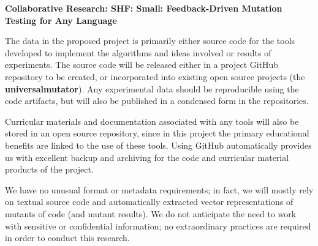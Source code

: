 \documentclass{article}
\begin{document}
\begin{center}
{\Large\sf\textbf{Collaborative Research: SHF: Small: Feedback-Driven Mutation Testing for Any Language}}
\end{center}

The data in the proposed project is primarily either source code for
the tools developed to implement the algorithms and ideas involved or
results of experiments.  The source code will be released either in a
project GitHub repository to be created, or incorporated into existing
open source projects (the {\bf universalmutator}).  Any experimental data should be reproducible using the code artifacts, but will also be published in a condensed form in the repositories.

Curricular
materials and documentation associated with any tools will also be stored in
an open source repository, since in this project the primary
educational benefits are linked to the use of these tools.  Using GitHub automatically provides us with excellent backup
and archiving for the code and curricular material products of the
project.

We have no unusual format or metadata requirements; in fact, we will
mostly rely on textual source code and automatically extracted vector
representations of mutants of code (and mutant results).
We do not anticipate the need to work with sensitive or confidential
information; no extraordinary practices are required in order to
conduct this research.
\end{document}
